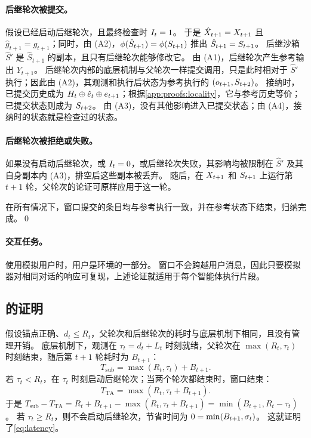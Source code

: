 \paragraph{后继轮次被提交。}
假设已经启动后继轮次，且最终检查时 $I_t=1$。
于是 $\hat X_{t+1}=X_{t+1}$ 且 $\hat g_{t+1}=g_{t+1}$；同时，由 (A2)，$\phi(\hat S_{t+1})=\phi(S_{t+1})$ 推出 $\hat S_{t+1}=S_{t+1}$。
后继沙箱 $\hat S'$ 是 $\hat S_{t+1}$ 的副本，且只有后继轮次能够修改它。
由 (A1)，后继轮次产生参考输出 $Y_{t+1}$。
后继轮次内部的底层机制与父轮次一样提交调用，只是此时相对于 $\hat S'$ 执行；因此由 (A2)，其观测和执行后状态为参考执行的 $(o_{t+1},S_{t+2})$。
接纳时，已提交历史成为 $H_t\oplus\hat e_t\oplus e_{t+1}$；根据\cref{app:proofs:locality}，它与参考历史等价；已提交状态则成为 $S_{t+2}$。
由 (A3)，没有其他影响进入已提交状态；由 (A4)，接纳时的状态就是检查过的状态。

\paragraph{后继轮次被拒绝或失败。}
如果没有启动后继轮次，或 $I_t=0$，或后继轮次失败，其影响均被限制在 $\hat S'$ 及其自身副本内 (A3)，排空后这些副本被丢弃。
随后，在 $X_{t+1}$ 和 $S_{t+1}$ 上运行第 $t{+}1$ 轮，父轮次的论证可原样应用于这一轮。

在所有情况下，窗口提交的条目均与参考执行一致，并在参考状态下结束，归纳完成。\qed

\paragraph{交互任务。}
使用模拟用户时，用户是环境的一部分。
窗口不会跨越用户消息，因此只要模拟器对相同对话的响应可复现，上述论证就适用于每个智能体执行片段。

\subsection{\texorpdfstring{}{窗口延迟命题}的证明}
\label{app:proofs:latency}

假设锚点正确、$d_t\le R_t$，父轮次和后继轮次的耗时与底层机制下相同，且没有管理开销。
底层机制下，观测在 $\tau_t=d_t+L_t$ 时刻就绪，父轮次在 $\max(R_t,\tau_t)$ 时刻结束，随后第 $t{+}1$ 轮耗时为 $B_{t+1}$：
\[
T_{\text{sub}}=\max(R_t,\tau_t)+B_{t+1}.
\]
若 $\tau_t<R_t$，\method 在 $\tau_t$ 时刻启动后继轮次；当两个轮次都结束时，窗口结束：
\[
T_{\text{TA}}=\max(R_t,\tau_t+B_{t+1}).
\]
于是 $T_{\text{sub}}-T_{\text{TA}}=R_t+B_{t+1}-\max(R_t,\tau_t+B_{t+1})=\min(B_{t+1},R_t-\tau_t)$。
若 $\tau_t\ge R_t$，则不会启动后继轮次，节省时间为 $0=\min(B_{t+1},\sigma_t)$。
这就证明了\cref{eq:latency}。

